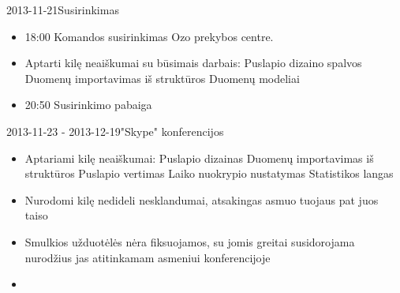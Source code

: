 \begin{loggentry}{2013-11-21}{Susirinkimas}

	\begin{itemize}
		\item 18:00 Komandos susirinkimas Ozo prekybos centre.
		\item Aptarti kilę neaiškumai su būsimais darbais:
			\subitem Puslapio dizaino spalvos
			\subitem Duomenų importavimas iš struktūros
			\subitem Duomenų modeliai
		\item 20:50 Susirinkimo pabaiga
	\end{itemize}
\end{loggentry}

\begin{loggentry}{2013-11-23 - 2013-12-19}{"Skype" konferencijos}

	\begin{itemize}
		\item Aptariami kilę neaiškumai:
			\subitem Puslapio dizainas
			\subitem Duomenų importavimas iš struktūros
			\subitem Puslapio vertimas
			\subitem Laiko nuokrypio nustatymas
			\subitem Statistikos langas
		\item Nurodomi kilę nedideli nesklandumai, atsakingas asmuo tuojaus pat juos taiso
		\item Smulkios užduotėlės nėra fiksuojamos, su jomis greitai susidorojama nurodžius jas atitinkamam asmeniui konferencijoje
		\item 
	\end{itemize}
\end{loggentry}